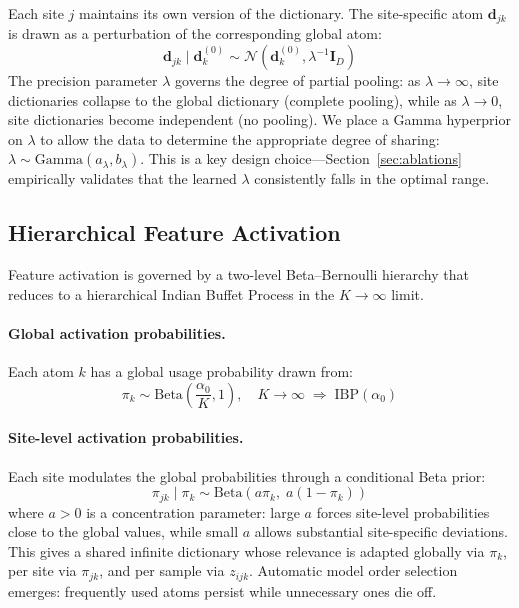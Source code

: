 \documentclass[11pt,a4paper]{article}
\theoremstyle{definition}
\begin{document}
Each site $j$ maintains its own version of the dictionary. The site-specific atom $\mathbf{d}_{jk}$ is drawn as a perturbation of the corresponding global atom:
\begin{equation}
  \mathbf{d}_{jk} \mid \mathbf{d}^{(0)}_k \sim \mathcal{N}(\mathbf{d}^{(0)}_k, \lambda^{-1}\mathbf{I}_D) \label{eq:site_atom}
\end{equation}
The precision parameter $\lambda$ governs the degree of partial pooling: as $\lambda \to \infty$, site dictionaries collapse to the global dictionary (complete pooling), while as $\lambda \to 0$, site dictionaries become independent (no pooling). We place a Gamma hyperprior on $\lambda$ to allow the data to determine the appropriate degree of sharing: $\lambda \sim \text{Gamma}(a_\lambda, b_\lambda)$. This is a key design choice---Section~\ref{sec:ablations} empirically validates that the learned $\lambda$ consistently falls in the optimal range.

\subsection{Hierarchical Feature Activation}

Feature activation is governed by a two-level Beta--Bernoulli hierarchy that reduces to a hierarchical Indian Buffet Process in the $K \to \infty$ limit.

\paragraph{Global activation probabilities.} Each atom $k$ has a global usage probability drawn from:
\begin{equation}
  \pi_k \sim \text{Beta}\!\left(\frac{\alpha_0}{K}, 1\right), \quad K \to \infty \;\Rightarrow\; \text{IBP}(\alpha_0) \label{eq:ibp}
\end{equation}

\paragraph{Site-level activation probabilities.} Each site modulates the global probabilities through a conditional Beta prior:
\begin{equation}
  \pi_{jk} \mid \pi_k \sim \text{Beta}(a\pi_k,\; a(1 - \pi_k)) \label{eq:site_pi}
\end{equation}
where $a > 0$ is a concentration parameter: large $a$ forces site-level probabilities close to the global values, while small $a$ allows substantial site-specific deviations. This gives a shared infinite dictionary whose relevance is adapted globally via $\pi_k$, per site via $\pi_{jk}$, and per sample via $z_{ijk}$. Automatic model order selection emerges: frequently used atoms persist while unnecessary ones die off.
\end{document}

